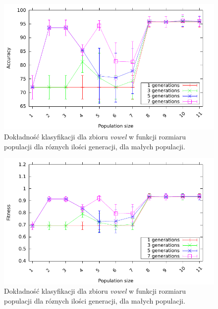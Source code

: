 	\begin{figure}
		\includegraphics[scale=0.90]{figures/accuracy/accuracy-vowel-detailed}
		\caption{Dokładność klasyfikacji dla zbioru \emph{vowel} w funkcji rozmiaru populacji dla róznych ilości generacji, dla małych populacji.\label{fig:acc-vowel-detailed}}
	\end{figure}
		
	\begin{figure}
		\includegraphics[scale=0.90]{figures/accuracy/fitness-vowel-detailed}
		\caption{Dokładność klasyfikacji dla zbioru \emph{vowel} w funkcji rozmiaru populacji dla róznych ilości generacji, dla małych populacji.\label{fig:fit-vowel-detailed}}
	\end{figure}
	

